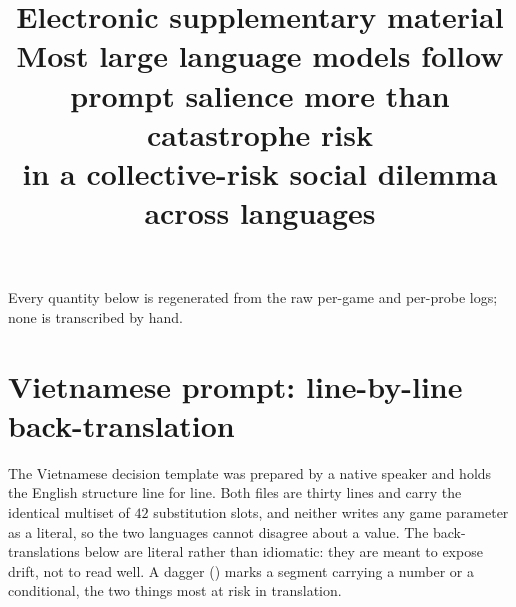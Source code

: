 \documentclass[11pt,a4paper]{article}
\title{Electronic supplementary material\\[2pt]
\large Most large language models follow prompt salience more than catastrophe risk\\
in a collective-risk social dilemma across languages}
\author{}
\date{}
\begin{document}
\maketitle
\vspace{-2.4em}

\noindent Every quantity below is regenerated from the raw per-game and per-probe logs;
none is transcribed by hand.

\tableofcontents

\section{Vietnamese prompt: line-by-line back-translation}
\label{sec:backtranslation}

The Vietnamese decision template was prepared by a native speaker and holds the English
structure line for line. Both files are thirty lines and carry the identical multiset of
$42$ substitution slots, and neither writes any game parameter as a literal, so the two
languages cannot disagree about a value. The back-translations below are literal rather than
idiomatic: they are meant to expose drift, not to read well. A dagger (\dag) marks a
segment carrying a number or a conditional, the two things most at risk in translation.
\end{document}
